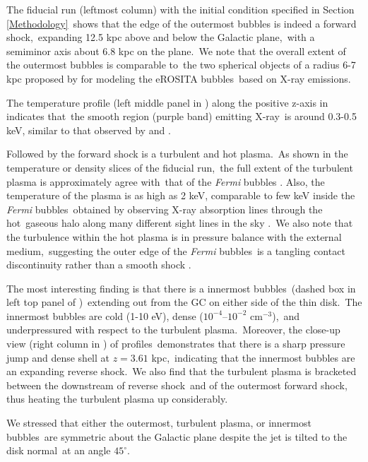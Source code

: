 \documentclass[twocolumn]{aastex631}
\begin{document}
 The fiducial run (leftmost column) with the initial condition specified in Section \ref{Methodology}\
 shows that the edge of the outermost bubbles is indeed a forward shock,\
 expanding 12.5 kpc above and below the Galactic plane,\
 with a semiminor axis about 6.8 kpc on the plane.\
 We note that the overall extent of the outermost bubbles is comparable to\
 the two spherical objects of a radius 6-7 kpc proposed by \citet{Predehl2020} for modeling the eROSITA bubbles\
 based on X-ray emissions.

 The temperature profile (left middle panel in ) along the positive z-axis in\
  indicates that\
 the smooth region (purple band) emitting X-ray\
 is around 0.3-0.5 keV, similar to that observed by \citet{Miller2016} and \citet{Kataoka2018}.

 Followed by the forward shock is a turbulent and hot plasma.\
 As shown in the temperature or density slices of the fiducial run,\
 the full extent of the turbulent plasma is approximately agree with\
 that of the \textit{Fermi} bubbles \citep{Su2010}.
 Also, the temperature of the plasma is as high as 2 keV, comparable to few keV inside the \textit{Fermi} bubbles\
 obtained by observing X-ray absorption lines through the hot\
 gaseous halo along many different sight lines in the sky \citep{Miller_2013}.\
 We also note that the turbulence within the hot plasma is in pressure balance with the external medium,\
 suggesting the outer edge of the \textit{Fermi} bubbles\
 is a tangling contact discontinuity rather than a smooth shock \citep{Zhang2020}.

 The most interesting finding is that there is a innermost bubbles\
 (dashed box in left top panel of )\
 extending out from the GC on either side of the thin disk.\
 The innermost bubbles are cold (1-10 eV), dense ($10^{-4}$--$10^{-2}$ cm$^{-3}$),\
 and underpressured with respect to the turbulent plasma.\
 Moreover, the close-up view (right column in ) of profiles\
 demonstrates that there is a sharp pressure jump and dense shell at $z=3.61$ kpc,\
 indicating that the innermost bubbles are an expanding reverse shock.\
 We also find that the turbulent plasma is bracketed between the downstream of reverse shock\
 and of the outermost forward shock, thus heating the turbulent plasma up considerably.

 We stressed that either the outermost, turbulent plasma, or innermost bubbles\
 are symmetric about the Galactic plane despite the jet is tilted to the disk normal\
 at an angle $45^{\circ}$.
\end{document}
